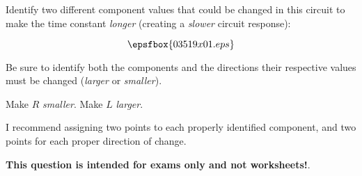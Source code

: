 

Identify two different component values that could be changed in this circuit to make the time constant {\it longer} (creating a {\it slower} circuit response):

$$\epsfbox{03519x01.eps}$$

Be sure to identify both the components and the directions their respective values must be changed ({\it larger} or {\it smaller}).







Make $R$ {\it smaller}. \hskip 30pt Make $L$ {\it larger}.

\vskip 10pt

I recommend assigning two points to each properly identified component, and two points for each proper direction of change.







{\bf This question is intended for exams only and not worksheets!}.




